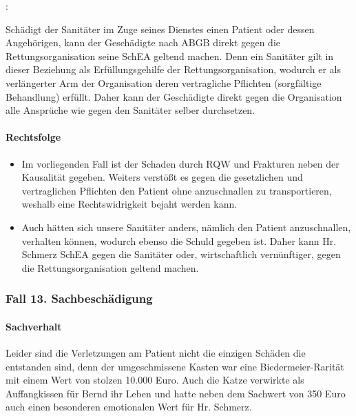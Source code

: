 :

Schädigt der Sanitäter im Zuge seines Dienstes einen Patient oder
dessen Angeh\"origen, kann der Geschädigte nach
 ABGB direkt gegen die
Rettungsorganisation seine SchEA geltend machen. Denn ein Sanitäter
gilt in dieser Beziehung als Erf\"ullungsgehilfe der
Rettungsorganisation, wodurch er als verlängerter Arm der
Organisation deren vertragliche Pflichten (sorgfältige Behandlung)
erf\"ullt. Daher kann der Geschädigte direkt gegen die Organisation
alle Anspr\"uche wie gegen den Sanitäter selber durchsetzen.

\paragraph*{Rechtsfolge}

\begin{itemize}
	\item {\mdseries\color[rgb]{0.0,0.0,0.5019608}
	Im vorliegenden Fall ist der Schaden durch RQW und Frakturen neben der
	Kausalität gegeben. Weiters verst\"o{\ss}t es gegen die gesetzlichen
	und vertraglichen Pflichten den Patient ohne anzuschnallen zu
	transportieren, weshalb eine Rechtswidrigkeit bejaht werden kann. }

	\item {\mdseries\color[rgb]{0.0,0.0,0.5019608}
	Auch hätten sich unsere Sanitäter anders, nämlich den Patient
	anzuschnallen, verhalten k\"onnen, wodurch ebenso die Schuld gegeben
	ist. Daher kann Hr. Schmerz SchEA gegen die Sanitäter oder,
	wirtschaftlich vern\"unftiger, gegen die Rettungsorganisation geltend
	machen.}

\end{itemize}

\subsubsection{Fall 13. Sachbeschädigung}

\paragraph*{Sachverhalt}

Leider sind die Verletzungen am Patient nicht die einzigen Schäden die
entstanden sind, denn der umgeschmissene Kasten war eine
Biedermeier-Rarität mit einem Wert von stolzen 10.000 Euro. Auch die
Katze verwirkte als Auffangkissen f\"ur Bernd ihr Leben und hatte neben
dem Sachwert von 350 Euro auch einen besonderen emotionalen Wert f\"ur
Hr. Schmerz.

